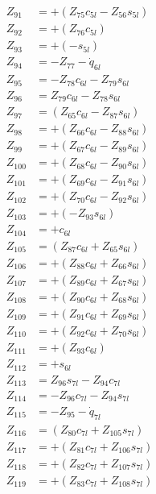 \begin{multicols}{2}
\begin{align}
Z_{91} &= + (Z_{75}c_{5l} - Z_{56}s_{5l}) \nonumber \\
Z_{92} &= + (Z_{76}c_{5l}) \nonumber \\
Z_{93} &= + (-s_{5l}) \nonumber \\
Z_{94} &=                   - Z_{77} - \dot{q}_{6l} \nonumber \\
Z_{95} &= - Z_{78}c_{6l} - Z_{79}s_{6l} \nonumber \\
Z_{96} &=   Z_{79}c_{6l} - Z_{78}s_{6l} \nonumber \\
Z_{97} &= (Z_{65}c_{6l} - Z_{87}s_{6l}) \nonumber \\
Z_{98} &= + (Z_{66}c_{6l} - Z_{88}s_{6l}) \nonumber \\
Z_{99} &= + (Z_{67}c_{6l} - Z_{89}s_{6l}) \nonumber \\
Z_{100} &= + (Z_{68}c_{6l} - Z_{90}s_{6l}) \nonumber \\
Z_{101} &= + (Z_{69}c_{6l} - Z_{91}s_{6l}) \nonumber \\
Z_{102} &= + (Z_{70}c_{6l} - Z_{92}s_{6l}) \nonumber \\
Z_{103} &= + (-Z_{93}s_{6l}) \nonumber \\ 
Z_{104} &= + c_{6l} \nonumber \\
Z_{105} &= (Z_{87}c_{6l} + Z_{65}s_{6l}) \nonumber \\
Z_{106} &= + (Z_{88}c_{6l} + Z_{66}s_{6l}) \nonumber \\
Z_{107} &= + (Z_{89}c_{6l} + Z_{67}s_{6l}) \nonumber \\
Z_{108} &= + (Z_{90}c_{6l} + Z_{68}s_{6l}) \nonumber \\
Z_{109} &= + (Z_{91}c_{6l} + Z_{69}s_{6l}) \nonumber \\
Z_{110} &= + (Z_{92}c_{6l} + Z_{70}s_{6l}) \nonumber \\
Z_{111} &= + (Z_{93}c_{6l}) \nonumber \\
Z_{112} &= + s_{6l} \nonumber \\
Z_{113} &=   Z_{96}s_{7l} - Z_{94}c_{7l} \nonumber \\
Z_{114} &= - Z_{96}c_{7l} - Z_{94}s_{7l} \nonumber \\
Z_{115} &=                   - Z_{95} - \dot{q}_{7l} \nonumber \\
Z_{116} &= (Z_{80}c_{7l} + Z_{105}s_{7l}) \nonumber \\
Z_{117} &= + (Z_{81}c_{7l} + Z_{106}s_{7l}) \nonumber \\
Z_{118} &= + (Z_{82}c_{7l} + Z_{107}s_{7l}) \nonumber \\
Z_{119} &= + (Z_{83}c_{7l} + Z_{108}s_{7l}) \nonumber \\

\end{align}
\end{multicols}

